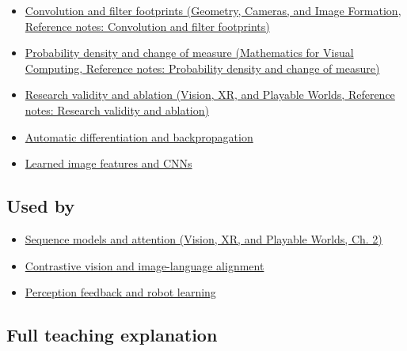 \hypertarget{appendix-a9d5dfdd164a-prerequisites}{}

\begin{itemize}
\tightlist
\item
  \href{../03-Geometry-Cameras-and-Image-Formation/main.pdf\#nameddest=appendix-d5b3c692d9f0}{Convolution and filter footprints (Geometry, Cameras, and Image Formation, Reference notes: Convolution and filter footprints)}
\item
  \href{../02-Mathematics-for-Visual-Computing/main.pdf\#nameddest=appendix-4815cd87ab8b}{Probability density and change of measure (Mathematics for Visual Computing, Reference notes: Probability density and change of measure)}
\item
  \href{../07-Vision-XR-and-Playable-Worlds/main.pdf\#nameddest=appendix-65788587ef78}{Research validity and ablation (Vision, XR, and Playable Worlds, Reference notes: Research validity and ablation)}
\item
  \hyperref[appendix-40df0855b4a7]{Automatic differentiation and backpropagation}
\item
  \hyperref[appendix-47c51ea026fb]{Learned image features and CNNs}
\end{itemize}

\subsection{Used by}\label{appendix-a9d5dfdd164a-used-by}

\hypertarget{appendix-a9d5dfdd164a-used-by}{}

\begin{itemize}
\tightlist
\item
  \href{../07-Vision-XR-and-Playable-Worlds/main.pdf\#nameddest=04-visual-computing-ii-ch031-sequence-models-and-attention}{Sequence models and attention (Vision, XR, and Playable Worlds, Ch. 2)}
\item
  \hyperref[appendix-772f1fd96148]{Contrastive vision and image-language alignment}
\item
  \hyperref[appendix-b0c42da325f1]{Perception feedback and robot learning}
\end{itemize}

\subsection{Full teaching explanation}\label{appendix-a9d5dfdd164a-full-teaching-explanation}

\hypertarget{appendix-a9d5dfdd164a-full-teaching-explanation}{}

